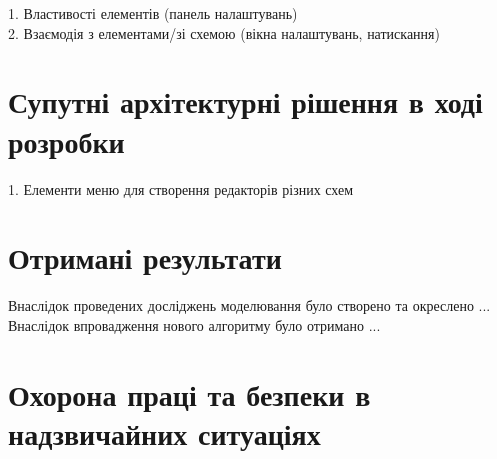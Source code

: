 \documentclass[12pt,a4paper]{article}
\begin{document}

1. Властивості елементів (панель налаштувань)\\
2. Взаємодія з елементами/зі схемою (вікна налаштувань, натискання)

\clearpage

\section{Супутні архітектурні рішення в ході розробки}


1. Елементи меню для створення редакторів різних схем

\clearpage

\section{Отримані результати}

Внаслідок проведених досліджень моделювання було створено та окреслено ...\\
Внаслідок впровадження нового алгоритму було отримано ...

\clearpage

\section{Охорона праці та безпеки в надзвичайних ситуаціях}
\end{document}
